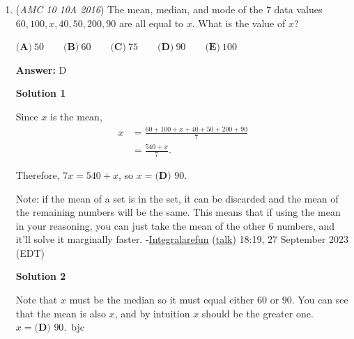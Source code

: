 \begin{enumerate}
\textbf{Solution}

For every tens digit 2, we subtract 10, and for every units digit 2, we subtract 1. Because 2 appears 10 times as a tens digit and 2 appears 3 times as a units digit, the answer is $10\cdot 10+1\cdot 3=\boxed{\textbf{(D) }103.}$




\textbf{Solution 2 (Brute Force)}

The sum of Ximena's numbers is $\frac{30(30-1)}{2}$ which equals $435$. The sum of Emilio's numbers is $332$. So, the difference is $\boxed{\textbf{(D) }103.}$ ~ sdmd

 Education, the Study of Education.

 


 


 


	\item (\textit{AMC 10 10A 2016}) The mean, median, and mode of the $7$ data values $60, 100, x, 40, 50, 200, 90$ are all equal to $x$. What is the value of $x$?


 $\textbf{(A)}\ 50 \qquad\textbf{(B)}\ 60 \qquad\textbf{(C)}\ 75 \qquad\textbf{(D)}\ 90 \qquad\textbf{(E)}\ 100$

 \textbf{Answer: }D



\textbf{Solution 1}

Since $x$ is the mean,
 \begin{align*} x&=\frac{60+100+x+40+50+200+90}{7}\\ &=\frac{540+x}{7}. \end{align*}


 Therefore, $7x=540+x$, so $x=\boxed{\textbf{(D) }90}.$

 Note: if the mean of a set is in the set, it can be discarded and the mean of the remaining numbers will be the same. This means that if using the mean in your reasoning, you can just take the mean of the other 6 numbers, and it'll solve it marginally faster. -\href{https://artofproblemsolving.com/wiki/index.php?title=User:Integralarefun}{Integralarefun} (\href{https://artofproblemsolving.com/wiki/index.php?title=User\_talk:Integralarefun}{talk}) 18:19, 27 September 2023 (EDT)

 



\textbf{Solution 2}

Note that $x$ must be the median so it must equal either $60$ or $90$. You can see that the mean is also $x$, and by intuition $x$ should be the greater one. $x=\boxed{\textbf{(D) }90}.$~bjc


\end{enumerate}
